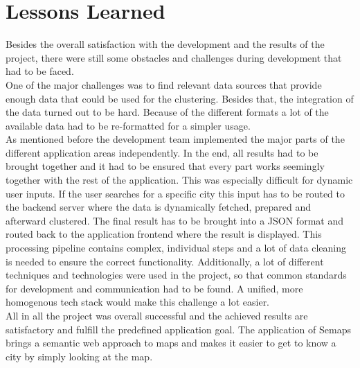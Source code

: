 \section{Lessons Learned}
Besides the overall satisfaction with the development and the results of the project, there were still some obstacles and challenges during development that had to be faced.
\\

One of the major challenges was to find relevant data sources that provide enough data that could be used for the clustering. Besides that, the integration of the data turned out to be hard. Because of the different formats a lot of the available data had to be re-formatted for a simpler usage.
\\

As mentioned before the development team implemented the major parts of the different application areas independently. In the end, all results had to be brought together and it had to be ensured that every part works seemingly together with the rest of the application. This was especially difficult for dynamic user inputs. If the user searches for a specific city this input has to be routed to the backend server where the data is dynamically fetched, prepared and afterward clustered. The final result has to be brought into a JSON format and routed back to the application frontend where the result is displayed. This processing pipeline contains complex, individual steps and a lot of data cleaning is needed to ensure the correct functionality. Additionally, a lot of different techniques and technologies were used in the project, so that common standards for development and communication had to be found. A unified, more homogenous tech stack would make this challenge a lot easier.
\\

All in all the project was overall successful and the achieved results are satisfactory and fulfill the predefined application goal. The application of Semaps brings a semantic web approach to maps and makes it easier to get to know a city by simply looking at the map.
